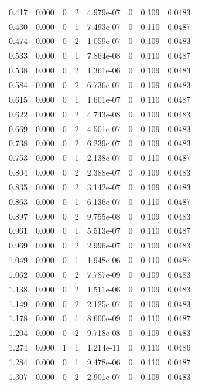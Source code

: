 \documentclass[preview]{standalone}
\begin{document}
{{\begin{tabular}{L{1.2cm}C{1.2cm} C{0.3cm}C{0.5cm} C{1.4cm}C{1.4cm} C{1.4cm}C{1.4cm}}
  0.417  &  0.000  & 0     &  2 &  4.979e-07  & 0  & 0.109 &  0.0483   \\ 
  0.430  &  0.000  & 0     &  1 &  7.493e-07  & 0  & 0.110 &  0.0487   \\ 
  0.474  &  0.000  & 0     &  2 &  1.059e-07  & 0  & 0.109 &  0.0483   \\ 
  0.533  &  0.000  & 0     &  1 &  7.864e-08  & 0  & 0.110 &  0.0487   \\ 
  0.538  &  0.000  & 0     &  2 &  1.361e-06  & 0  & 0.109 &  0.0483   \\ 
  0.584  &  0.000  & 0     &  2 &  6.736e-07  & 0  & 0.109 &  0.0483   \\ 
  0.615  &  0.000  & 0     &  1 &  1.601e-07  & 0  & 0.110 &  0.0487   \\ 
  0.622  &  0.000  & 0     &  2 &  4.743e-08  & 0  & 0.109 &  0.0483   \\ 
  0.669  &  0.000  & 0     &  2 &  4.501e-07  & 0  & 0.109 &  0.0483   \\ 
  0.738  &  0.000  & 0     &  2 &  6.239e-07  & 0  & 0.109 &  0.0483   \\ 
  0.753  &  0.000  & 0     &  1 &  2.138e-07  & 0  & 0.110 &  0.0487   \\ 
  0.804  &  0.000  & 0     &  2 &  2.388e-07  & 0  & 0.109 &  0.0483   \\ 
  0.835  &  0.000  & 0     &  2 &  3.142e-07  & 0  & 0.109 &  0.0483   \\ 
  0.863  &  0.000  & 0     &  1 &  6.136e-07  & 0  & 0.110 &  0.0487   \\ 
  0.897  &  0.000  & 0     &  2 &  9.755e-08  & 0  & 0.109 &  0.0483   \\ 
  0.961  &  0.000  & 0     &  1 &  5.513e-07  & 0  & 0.110 &  0.0487   \\ 
  0.969  &  0.000  & 0     &  2 &  2.996e-07  & 0  & 0.109 &  0.0483   \\ 
  1.049  &  0.000  & 0     &  1 &  1.948e-06  & 0  & 0.110 &  0.0487   \\ 
  1.062  &  0.000  & 0     &  2 &  7.787e-09  & 0  & 0.109 &  0.0483   \\ 
  1.138  &  0.000  & 0     &  2 &  1.511e-06  & 0  & 0.109 &  0.0483   \\ 
  1.149  &  0.000  & 0     &  2 &  2.125e-07  & 0  & 0.109 &  0.0483   \\ 
  1.178  &  0.000  & 0     &  1 &  8.600e-09  & 0  & 0.110 &  0.0487   \\ 
  1.204  &  0.000  & 0     &  2 &  9.718e-08  & 0  & 0.109 &  0.0483   \\ 
  1.274  &  0.000  & 1     &  1 &  1.214e-11  & 0  & 0.110 &  0.0486   \\ 
  1.284  &  0.000  & 0     &  1 &  9.478e-06  & 0  & 0.110 &  0.0487   \\ 
  1.307  &  0.000  & 0     &  2 &  2.901e-07  & 0  & 0.109 &  0.0483   \\ 
\hline 
\end{tabular} 

}}
\end{document}
